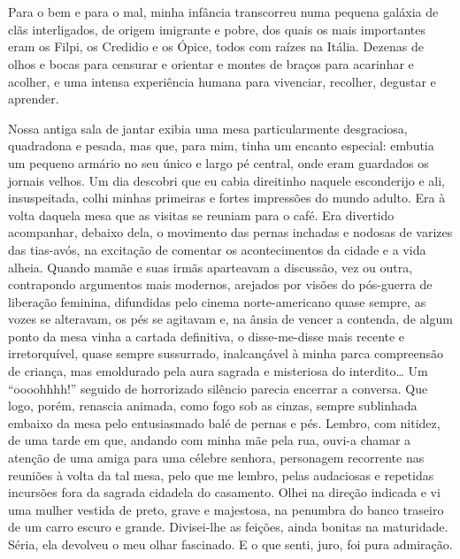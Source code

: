 \chapter{}
Para o bem e para o mal, minha infância transcorreu numa pequena galáxia de clãs interligados, de origem imigrante e pobre, dos quais os mais importantes eram os Filpi, os Credidio e os Ópice, todos com raízes na Itália. 
Dezenas de olhos e bocas para censurar e orientar e montes de braços para acarinhar e acolher, e uma intensa experiência humana para vivenciar, recolher, degustar e aprender. 

Nossa antiga sala de jantar exibia uma mesa particularmente desgraciosa, quadradona e pesada, mas que, para mim, tinha um encanto especial: embutia um pequeno armário no seu único e largo pé central, onde eram guardados os jornais velhos. 
Um dia descobri que eu cabia direitinho naquele esconderijo e ali, insuspeitada, colhi minhas primeiras e fortes impressões do mundo adulto.  
Era à volta daquela mesa que as visitas se reuniam para o café. 
Era divertido acompanhar, debaixo dela, o movimento das pernas inchadas e nodosas de varizes das tias-avós, na excitação de comentar os acontecimentos da cidade e a vida alheia. 
Quando mamãe e suas irmãs aparteavam a discussão, vez ou outra, contrapondo argumentos mais modernos, arejados por visões do pós-guerra de liberação feminina, difundidas pelo cinema norte-americano quase sempre, as vozes se alteravam, os pés se agitavam e, na ânsia de vencer a contenda, de algum ponto da mesa vinha a cartada definitiva, o disse-me-disse mais recente e irretorquível, quase sempre sussurrado, inalcançável à minha parca compreensão de criança, mas emoldurado pela aura sagrada e misteriosa do interdito\dots 
Um ``oooohhhh!'' seguido de horrorizado silêncio parecia encerrar a conversa. 
Que logo, porém, renascia animada, como fogo sob as cinzas, sempre sublinhada embaixo da mesa pelo entusiasmado balé de pernas e pés. 
Lembro, com nitidez, de uma tarde em que, andando com minha mãe pela rua, ouvi-a chamar a atenção de uma amiga para uma célebre senhora, personagem recorrente nas reuniões à volta da tal mesa, pelo que me lembro, pelas audaciosas e repetidas incursões fora da sagrada cidadela do casamento. 
Olhei na direção indicada e vi uma mulher vestida de preto, grave e majestosa, na penumbra do banco traseiro de um carro escuro e grande.
Divisei-lhe as feições, ainda bonitas na maturidade. 
Séria, ela devolveu o meu olhar fascinado. E o que senti, juro, foi pura admiração.

